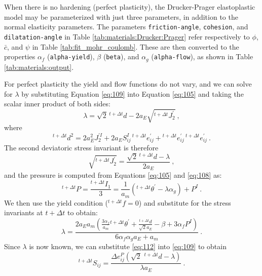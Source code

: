 When there is no hardening (perfect plasticity), the Drucker-Prager
elastoplastic model may be parameterized with just three parameters,
in addition to the normal elasticity parameters. The parameters \texttt{friction-angle},
\texttt{cohesion}, and \texttt{dilatation-angle} in Table \vref{tab:materials:Drucker:Prager}
refer respectively to $\phi$, $\bar{c}$, and $\psi$ in Table \vref{tab:fit_mohr_coulomb}.
These are then converted to the properties $\alpha_{f}$ (\texttt{alpha-yield}),
$\beta$ (\texttt{beta}), and $\alpha_{g}$ (\texttt{alpha-flow}),
as shown in Table \vref{tab:materials:output}.

For perfect plasticity the yield and flow functions do not vary, and
we can solve for $\lambda$ by substituting Equation \vref{eq:109}
into Equation \vref{eq:105} and taking the scalar inner product of
both sides:
\begin{equation}
\lambda=\sqrt{2}\,\phantom{}^{t+\Delta t}d-2a_{E}\sqrt{^{t+\Delta t}J_{2}^{\prime}}\:,\label{eq:110}
\end{equation}
where
\begin{equation}
^{t+\Delta t}d^{2}=2a_{E}^{2}J_{2}^{\prime I}+2a_{E}S_{ij}^{I}\,\phantom{}^{t+\Delta t}e_{ij}^{\prime}+\phantom{}^{t+\Delta t}e_{ij}^{\prime}\,\phantom{}^{t+\Delta t}e_{ij}^{\prime}\:.\label{eq:111}
\end{equation}
The second deviatoric stress invariant is therefore
\begin{equation}
\sqrt{^{t+\Delta t}J_{2}^{\prime}}=\frac{\sqrt{2}\,\phantom{}^{t+\Delta t}d-\lambda}{2a_{E}}\:,\label{eq:112}
\end{equation}
and the pressure is computed from Equations \vref{eq:105} and \vref{eq:108}
as:
\begin{equation}
^{t+\Delta t}P=\frac{^{t+\Delta t}I_{1}}{3}=\frac{1}{a_{m}}\left(^{t+\Delta t}\theta^{\prime}-\lambda\alpha_{g}\right)+P^{I}\:.\label{eq:113}
\end{equation}
We then use the yield condition ($^{t+\Delta t}f=0$) and substitute
for the stress invariants at $t+\Delta t$ to obtain:
\begin{equation}
\lambda=\frac{2a_{E}a_{m}\left(\frac{3\alpha_{f}}{a_{m}}\phantom{}^{t+\Delta t}\theta^{\prime}+\frac{^{t+\Delta t}d}{\sqrt{2}a_{E}}-\beta+3\alpha_{f}P^{I}\right)}{6\alpha_{f}\alpha_{g}a_{E}+a_{m}}\:.\label{eq:114}
\end{equation}
Since $\lambda$ is now known, we can substitute \vref{eq:112} into
\vref{eq:109} to obtain
\begin{equation}
^{t+\Delta t}S_{ij}=\frac{\Delta e_{ij}^{P}\left(\sqrt{2}\,\phantom{\,}^{t+\Delta t}d-\lambda\right)}{\lambda a_{E}}\:.\label{eq:115}
\end{equation}
